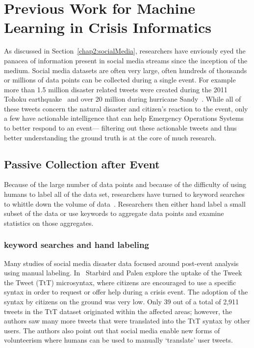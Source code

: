 \chapter{Previous Work for Machine Learning in Crisis Informatics}

As discussed in Section~\ref{chap2:socialMedia}, researchers have enviously eyed
the panacea of information present in social media streams since the inception
of the medium. Social media datasets are often very large, often hundreds of
thousands or millions of data points can be collected during a single event. For
example more than 1.5 million disaster related tweets were created during the
2011 Tohoku earthquake~\cite{doanAnalysisTwitterMessages2012} and over 20
million during hurricane Sandy~\cite{meierDigitalHumanitariansHow2015}. While
all of these tweets concern the natural disaster and citizen's reaction to the
event, only a few have actionable intelligence that can help Emergency
Operations Systems to better respond to an event--- filtering out these 
actionable tweets and thus better understanding the ground truth is at the core 
of much research. 

\section{Passive Collection after Event}
Because of the large number of data points and because of the difficulty of
using humans to label all of the data set, researchers have turned to keyword
searches to whittle down the volume of
data~\cite{doanAnalysisTwitterMessages2012}. Researchers then either hand label
a small subset of the data or use keywords to aggregate data points and examine
statistics on those aggregates.


\subsection{keyword searches and hand labeling}
Many studies of social media disaster data focused around post-event analysis
using manual labeling. In~\cite{starbirdVoluntweetersSelforganizingDigital}
Starbird and Palen explore the uptake of the Tweek the Tweet (TtT) microsyntax, where
citizens are encouraged to use a specific syntax in order to request or offer
help during a crisis event. The adoption of the syntax by citizens on the ground
was very low. Only 39 out of a total of 2,911 tweets in the TtT dataset originated within the affected
areas; however, the authors saw many more tweets that were translated into the
TtT syntax by other users. The authors also point out that social media enable new
forms of volunteerism where humans can be used to manually `translate' user tweets.

